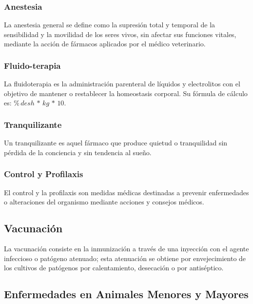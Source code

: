         \subsubsection{Anestesia}

            La anestesia general se define como la supresión total y temporal de la sensibilidad y la movilidad de los seres vivos, sin afectar sus funciones vitales, mediante la acción de fármacos aplicados por el médico veterinario.  %

        \subsubsection{Fluido-terapia}

            La fluidoterapia es la administración parenteral de líquidos y electrolitos con el objetivo de mantener o restablecer la homeostasis corporal. Su fórmula de cálculo es: \(\%\,desh\, *\, kg\, *\, 10\).  %

        \subsubsection{Tranquilizante}

            Un tranquilizante es aquel fármaco que produce quietud o tranquilidad sin pérdida de la conciencia y sin tendencia al sueño.  %

        \subsubsection{Control y Profilaxis}

            El control y la profilaxis son medidas médicas destinadas a prevenir enfermedades o alteraciones del organismo mediante acciones y consejos médicos.  %

    \subsection{Vacunación}

        La vacunación consiste en la inmunización a través de una inyección con el agente infeccioso o patógeno atenuado; esta atenuación se obtiene por envejecimiento de los cultivos de patógenos por calentamiento, desecación o por antiséptico. %

    \subsection{Enfermedades en Animales Menores y Mayores}

